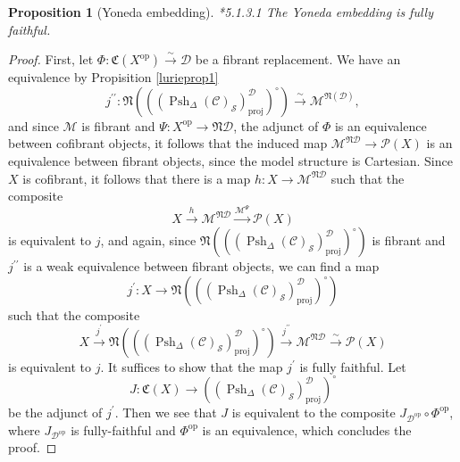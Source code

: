 \documentclass{amsart}
\numberwithin{equation}{section}
\theoremstyle{plain}   %
\newtheorem{prop}[subsection]{Proposition}
\theoremstyle{remark}
\theoremstyle{plain}
\newcommand{\op}{\ensuremath{\mathrm{op}}}
\newcommand{\M}{\ensuremath{\mathcal{M}}}
\newcommand{\Pre}{\ensuremath{\mathcal{P}}}
\newcommand{\setS}{\ensuremath{\mathscr{S}}}
\newcommand{\spsh}{\ensuremath{\operatorname{Psh}_\Delta(\mathcal{C})}}
\begin{document}
\begin{prop}[Yoneda embedding]\cite{htt}*{5.1.3.1}
	The Yoneda embedding is fully faithful.
\end{prop}
\begin{proof} 
	First, let \(\Phi:\mathfrak{C}(X^\op)\xrightarrow{\sim} \mathcal{D}\) be a fibrant replacement.  We have an equivalence by Propisition \ref{lurieprop1} 
	\[j^{\prime\prime}: \mathfrak{N}\left(\left((\spsh_\setS)^\mathcal{D}_\mathrm{proj}\right)^\circ\right) \xrightarrow{\sim} \M^{\mathfrak{N}(\mathcal{D})}, \]
	and since \(\M\) is fibrant and \(\Psi:X^\op \to \mathfrak{N}\mathcal{D}\), the adjunct of \(\Phi\) is an equivalence between cofibrant objects, it follows that the induced map \(\M^{\mathfrak{N}\mathcal{D}}\to \Pre(X)\) is an equivalence between fibrant objects, since the model structure is Cartesian.  Since \(X\) is cofibrant, it follows that there is a map \(h:X\to \M^{\mathfrak{N}\mathcal{D}}\) such that the composite
	\[X \xrightarrow{h} \M^{\mathfrak{N}\mathcal{D}} \xrightarrow{\M^{\Psi}} \Pre(X)\]
	is equivalent to \(j\), and again, since \(\mathfrak{N}\left(\left((\spsh_\setS)^\mathcal{D}_\mathrm{proj}\right)^\circ\right)\) is fibrant and \(j^{\prime\prime}\) is a weak equivalence between fibrant objects, we can find a map 
	\[j^\prime:X\to \mathfrak{N}\left(\left((\spsh_\setS)^\mathcal{D}_\mathrm{proj}\right)^\circ\right)\]
	such that the composite 
	\[X\xrightarrow{j^\prime} \mathfrak{N}\left(\left((\spsh_\setS)^\mathcal{D}_\mathrm{proj}\right)^\circ\right) \xrightarrow{j^{\prime\prime}} \M^{\mathfrak{N}\mathcal{D}} \xrightarrow{\sim} \Pre(X)\]
	is equivalent to \(j\).
	It suffices to show that the map \(j^\prime\) is fully faithful.  Let 
	\[J:\mathfrak{C}(X) \to \left((\spsh_\setS)^\mathcal{D}_\mathrm{proj}\right)^\circ\]
	be the adjunct of \(j^\prime\).  Then we see that \(J\) is equivalent to the composite \(J_{\mathcal{D^\op}}\circ \Phi^\op\), where \(J_{\mathcal{D^\op}}\) is fully-faithful and \(\Phi^\op\) is an equivalence, which concludes the proof.	
\end{proof}
\end{document}

